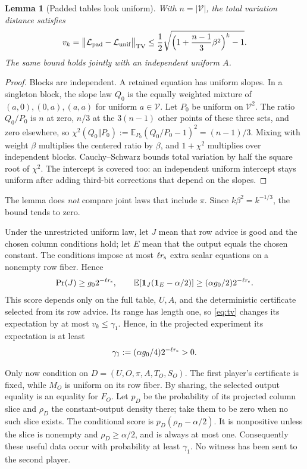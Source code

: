 \documentclass[11pt]{article}
\newtheorem{lemma}[theorem]{Lemma}
\newcommand{\E}{\mathbb E}
\newcommand{\ind}{\mathbf 1}
\begin{document}
\begin{lemma}[Padded tables look uniform]\label{lem:tv}
With $n=|\mathcal V|$, the total variation distance satisfies
\begin{equation}\label{eq:tv}
 v_k=\bigl\|\mathcal L_{\rm pad}-\mathcal L_{\rm unif}\bigr\|_{\rm TV}
 \le\frac12\sqrt{\Bigl(1+\frac{n-1}{3}\beta^2\Bigr)^k-1}.
\end{equation}
The same bound holds jointly with an independent uniform $A$.
\end{lemma}

\begin{proof}
Blocks are independent. A retained equation has uniform slopes. In a
singleton block, the slope law $Q_0$ is the equally weighted mixture of
$(a,0),(0,a),(a,a)$ for uniform $a\in\mathcal V$. Let $P_0$ be uniform on
$\mathcal V^2$. The ratio $Q_0/P_0$ is $n$ at zero, $n/3$ at the $3(n-1)$
other points of these three sets, and zero elsewhere, so
$\chi^2(Q_0\Vert P_0):=\E_{P_0}(Q_0/P_0-1)^2=(n-1)/3$. Mixing with weight
$\beta$ multiplies the centered ratio by $\beta$, and $1+\chi^2$ multiplies
over independent blocks. Cauchy--Schwarz bounds total variation by half
the square root of $\chi^2$. The intercept is covered too: an independent
uniform intercept stays uniform after adding third-bit corrections that
depend on the slopes.
\end{proof}

\noindent The lemma does \emph{not} compare joint laws that include $\pi$.
Since $k\beta^2=k^{-1/3}$, the bound tends to zero.

Under the unrestricted uniform law, let $J$ mean that row advice is good
and the chosen column conditions hold; let $E$ mean that the output equals
the chosen constant. The conditions impose at most $\ell r_{\rm s}$ extra scalar
equations on a nonempty row fiber. Hence
\[
 \Pr(J)\ge g_0 2^{-\ell r_{\rm s}},\qquad
 \E[\ind_J(\ind_E-\alpha/2)]\ge(\alpha g_0/2)2^{-\ell r_{\rm s}}.
\]
This score depends only on the full table, $U,A$, and the deterministic
certificate selected from its row advice. Its range has length one, so
\eqref{eq:tv} changes its expectation by at most $v_k\le\gamma_1$. Hence,
in the projected experiment its expectation is at least
\begin{equation}\label{eq:gamma1}
 \gamma_1:=(\alpha g_0/4)2^{-\ell r_{\rm s}}>0.
\end{equation}

Only now condition on $D=(U,O,\pi,A,T_O,S_O)$. The first player's
certificate is fixed, while $M_O$ is uniform on its row fiber. By sharing,
the selected output equality is an equality for $F_O$. Let $p_D$ be the
probability of its projected column slice and $\rho_D$ the constant-output
density there; take them to be zero when no such slice exists. The
conditional score is $p_D(\rho_D-\alpha/2)$. It is nonpositive unless the
slice is nonempty and $\rho_D\ge\alpha/2$, and is always at most one.
Consequently these useful data occur with probability at least $\gamma_1$.
No witness has been sent to the second player.
\end{document}
